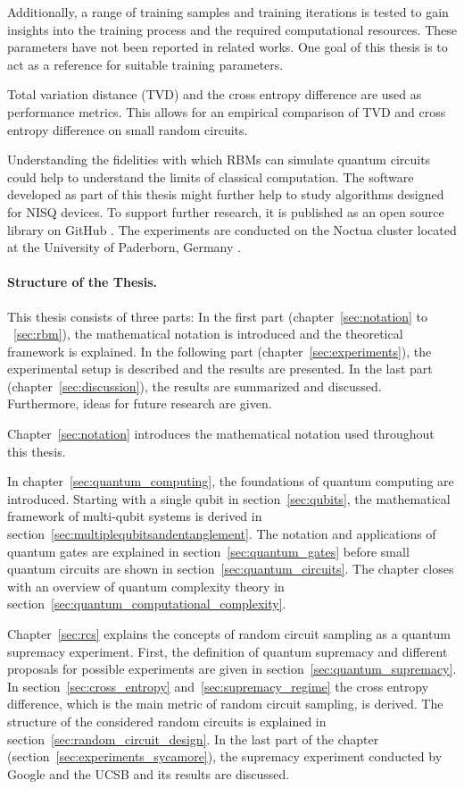 Additionally, a range of training samples and training iterations 
is tested to gain insights into the training process and the required computational resources. 
These parameters have not been reported in related works. One goal of this thesis is 
to act as a reference for suitable training parameters. 

Total variation distance (TVD) and the cross entropy difference are used as 
performance metrics. This allows for an empirical comparison of TVD and cross entropy difference 
on small random circuits.

Understanding the
fidelities with which RBMs can simulate quantum circuits could help to understand
the limits of classical computation. The software developed as part of this thesis 
might further help to study algorithms designed for NISQ devices. To support 
further research, it is published as 
an open source library on GitHub \cite{NQS2020}.
The experiments are conducted on the Noctua cluster located at the 
University of Paderborn, Germany \cite{noctua2020}.

\paragraph{Structure of the Thesis.}
This thesis consists of three parts: 
In the first part (chapter~\ref{sec:notation} to ~\ref{sec:rbm}), the mathematical 
notation is introduced and the theoretical framework is explained. In the 
following part (chapter~\ref{sec:experiments}), 
the experimental setup is described and the results are presented. 
In the last part (chapter~\ref{sec:discussion}), the results are summarized and discussed.
Furthermore, ideas for future research are given.

Chapter~\ref{sec:notation} introduces the mathematical notation used throughout this 
thesis.

In chapter~\ref{sec:quantum_computing}, the foundations of quantum computing are introduced. 
Starting with a single qubit in section~\ref{sec:qubits}, the mathematical framework of multi-qubit systems is derived
in section~\ref{sec:multiplequbitsandentanglement}. The notation and applications 
of quantum gates are explained in section~\ref{sec:quantum_gates} before small quantum circuits are shown
in section~\ref{sec:quantum_circuits}. The chapter closes with an overview of quantum complexity 
theory in section~\ref{sec:quantum_computational_complexity}.

Chapter~\ref{sec:rcs} explains the concepts of random circuit sampling as a quantum supremacy experiment.
First, the definition of quantum supremacy and different proposals for possible experiments 
are given in section~\ref{sec:quantum_supremacy}. 
In section~\ref{sec:cross_entropy} and~\ref{sec:supremacy_regime} the 
cross entropy difference, which is the main metric of random circuit sampling, is derived.
The structure of the considered random circuits is explained in section~\ref{sec:random_circuit_design}.
In the last part of the chapter (section~\ref{sec:experiments_sycamore}), the supremacy experiment conducted by Google and the UCSB 
and its results are discussed.

